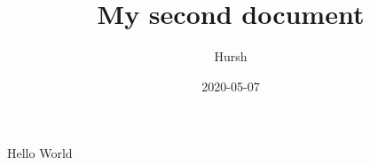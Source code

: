 \documentclass{article}
\title{My second document}
\date{2020-05-07}
\author{Hursh}
\begin{document}
	\maketitle
	\newpage
	
	Hello World
\end{document}
